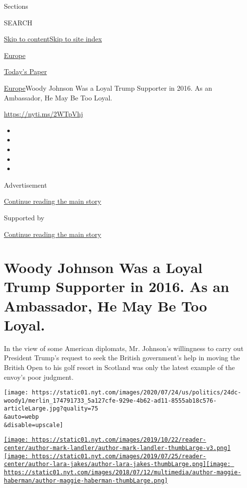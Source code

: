 Sections

SEARCH

\protect\hyperlink{site-content}{Skip to
content}\protect\hyperlink{site-index}{Skip to site index}

\href{https://www.nytimes.com/section/world/europe}{Europe}

\href{https://myaccount.nytimes.com/auth/login?response_type=cookie\&client_id=vi}{}

\href{https://www.nytimes.com/section/todayspaper}{Today's Paper}

\href{/section/world/europe}{Europe}\textbar{}Woody Johnson Was a Loyal
Trump Supporter in 2016. As an Ambassador, He May Be Too Loyal.

\url{https://nyti.ms/2WTpVhj}

\begin{itemize}
\item
\item
\item
\item
\item
\end{itemize}

Advertisement

\protect\hyperlink{after-top}{Continue reading the main story}

Supported by

\protect\hyperlink{after-sponsor}{Continue reading the main story}

\hypertarget{woody-johnson-was-a-loyal-trump-supporter-in-2016-as-an-ambassador-he-may-be-too-loyal}{%
\section{Woody Johnson Was a Loyal Trump Supporter in 2016. As an
Ambassador, He May Be Too
Loyal.}\label{woody-johnson-was-a-loyal-trump-supporter-in-2016-as-an-ambassador-he-may-be-too-loyal}}

In the view of some American diplomats, Mr. Johnson's willingness to
carry out President Trump's request to seek the British government's
help in moving the British Open to his golf resort in Scotland was only
the latest example of the envoy's poor judgment.

\texttt{[image: https://static01.nyt.com/images/2020/07/24/us/politics/24dc-woody1/merlin\_174791733\_5a127cfe-929e-4b62-ad11-8555ab18c576-articleLarge.jpg?quality=75\\\&auto=webp\\\&disable=upscale]}

\href{https://www.nytimes.com/by/mark-landler}{\texttt{[image: https://static01.nyt.com/images/2019/10/22/reader-center/author-mark-landler/author-mark-landler-thumbLarge-v3.png]}}\href{https://www.nytimes.com/by/lara-jakes}{\texttt{[image: https://static01.nyt.com/images/2019/07/25/reader-center/author-lara-jakes/author-lara-jakes-thumbLarge.png]}}\href{https://www.nytimes.com/by/maggie-haberman}{\texttt{[image: https://static01.nyt.com/images/2018/07/12/multimedia/author-maggie-haberman/author-maggie-haberman-thumbLarge.png]}}

